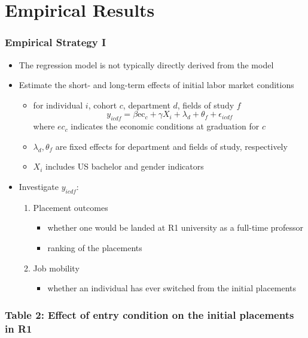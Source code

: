 \documentclass[10pt,svgnames,fragile]{beamer}
\begin{document}
{
	\AtBeginSection{}
\section{Empirical Results}
\begin{frame}
	\frametitle{Empirical Strategy I}
	\begin{itemize}
		\item The regression model is not typically directly derived from the  model
		\vfill
		\item Estimate the short- and long-term effects of initial labor market conditions 
			\begin{itemize}
				\item for individual $i$, cohort $c$, department $d$, fields of study $f$
				\begin{equation}
					y_{icdf} = \beta \text{ec}_{c}+\gamma X_{i}+\lambda_{d}+\theta_f  +\epsilon_{icdf}
				\end{equation}
				where $ec_c$ indicates the economic conditions at graduation for $c$
				\item $\lambda_{d},\theta_f $ are fixed effects for department and fields of study, respectively
				\item $X_i$ includes US bachelor and gender indicators
	\end{itemize}
	\vfill
			\item Investigate $y_{icdf}$:
			\begin{enumerate}
				\item Placement outcomes
				\begin{itemize}
					\item whether one would be landed at R1 university as a full-time professor
					\item ranking of the placements
				\end{itemize}
				\item Job mobility
				\begin{itemize}
				\item whether an individual has ever switched from the initial placements
				\end{itemize}
	\vfill
			\end{enumerate}
\end{itemize}
\end{frame}




{
\begin{frame}
	\frametitle{Table 2: Effect of entry condition on the initial placements in R1}
	
\end{frame}}

}
\end{document}
